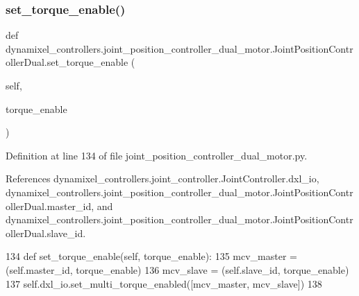 \subsubsection{\texorpdfstring{set\+\_\+torque\+\_\+enable()}{set\_torque\_enable()}}
{\footnotesize\ttfamily def dynamixel\+\_\+controllers.\+joint\+\_\+position\+\_\+controller\+\_\+dual\+\_\+motor.\+Joint\+Position\+Controller\+Dual.\+set\+\_\+torque\+\_\+enable (\begin{DoxyParamCaption}\item[{}]{self,  }\item[{}]{torque\+\_\+enable }\end{DoxyParamCaption})}



Definition at line 134 of file joint\+\_\+position\+\_\+controller\+\_\+dual\+\_\+motor.\+py.



References dynamixel\+\_\+controllers.\+joint\+\_\+controller.\+Joint\+Controller.\+dxl\+\_\+io, dynamixel\+\_\+controllers.\+joint\+\_\+position\+\_\+controller\+\_\+dual\+\_\+motor.\+Joint\+Position\+Controller\+Dual.\+master\+\_\+id, and dynamixel\+\_\+controllers.\+joint\+\_\+position\+\_\+controller\+\_\+dual\+\_\+motor.\+Joint\+Position\+Controller\+Dual.\+slave\+\_\+id.


\begin{DoxyCode}
134     \textcolor{keyword}{def }set\_torque\_enable(self, torque\_enable):
135         mcv\_master = (self.master\_id, torque\_enable)
136         mcv\_slave = (self.slave\_id, torque\_enable)
137         self.dxl\_io.set\_multi\_torque\_enabled([mcv\_master, mcv\_slave])
138 
\end{DoxyCode}
\mbox{\label{classdynamixel__controllers_1_1joint__position__controller__dual__motor_1_1_joint_position_controller_dual_a56380143862792ad3a6876de07d5b912}} 
